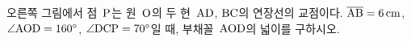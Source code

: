 \noindent\begin{minipage}[t]{0.58\linewidth}\vspace{0pt}\raggedright 오른쪽 그림에서 점~$\mathrm{P}$는 원~$\mathrm{O}$의 두 현~$\mathrm{AD}$, $\mathrm{BC}$의 연장선의 교점이다. $\overline{\mathrm{AB}}=6\,\mathrm{cm}$, $\angle\mathrm{AOD}=160^\circ$, $\angle\mathrm{DCP}=70^\circ$일 때, 부채꼴~$\mathrm{AOD}$의 넓이를 구하시오.\end{minipage}\hfill\begin{minipage}[t]{0.4\linewidth}\vspace{0pt}\centering \resizebox{\ifdim\width>\linewidth\linewidth\else\width\fi}{!}{}\end{minipage}\par
